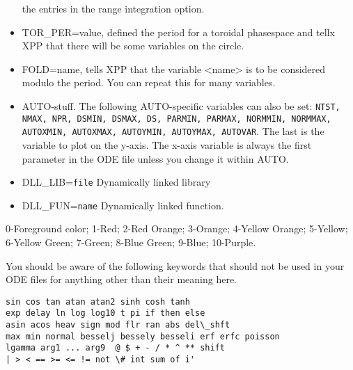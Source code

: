 \begin{itemize}
the entries in the range integration option.
\item TOR\_PER=value, defined the period for a toroidal phasespace and
tellx XPP that there will be some variables on the circle.
\item FOLD=name, tells XPP that the variable <name> is to be
considered modulo the period.  You can repeat this for many variables.
\item AUTO-stuff. The following AUTO-specific variables can also be
set: {\tt NTST, NMAX, NPR, DSMIN, DSMAX, DS, PARMIN, PARMAX, NORMMIN,
NORMMAX, AUTOXMIN, AUTOXMAX, AUTOYMIN, AUTOYMAX, AUTOVAR}.  The last
is the variable to plot on the y-axis. The x-axis variable is always
the first parameter in the ODE file unless you change it within AUTO. 
\item DLL\_LIB={\tt file} Dynamically linked library
\item  DLL\_FUN={\tt name} Dynamically linked function.
\end{itemize}

\bigskip 
{} 0-Foreground color; 1-Red; 2-Red Orange; 3-Orange;
4-Yellow Orange; 5-Yellow; 6-Yellow Green; 7-Green; 8-Blue Green; 9-Blue;
10-Purple.

\bigskip
{}
You should be aware of the following
keywords that should not be used in your ODE files for anything other
than their meaning here.
\begin{verbatim}
sin cos tan atan atan2 sinh cosh tanh
exp delay ln log log10 t pi if then else
asin acos heav sign mod flr ran abs del\_shft 
max min normal besselj bessely besseli erf erfc poisson
lgamma arg1 ... arg9  @ $ + - / * ^ ** shift
| > < == >= <= != not \# int sum of i'
\end{verbatim}




